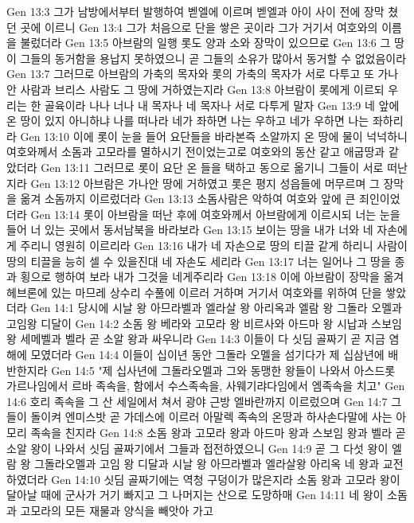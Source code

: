 Gen 13:3  그가 남방에서부터 발행하여 벧엘에 이르며 벧엘과 아이 사이 전에 장막 쳤던 곳에 이르니
Gen 13:4  그가 처음으로 단을 쌓은 곳이라 그가 거기서 여호와의 이름을 불렀더라
Gen 13:5  아브람의 일행 롯도 양과 소와 장막이 있으므로
Gen 13:6  그 땅이 그들의 동거함을 용납지 못하였으니 곧 그들의 소유가 많아서 동거할 수 없었음이라
Gen 13:7  그러므로 아브람의 가축의 목자와 롯의 가축의 목자가 서로 다투고 또 가나안 사람과 브리스 사람도 그 땅에 거하였는지라
Gen 13:8  아브람이 롯에게 이르되 우리는 한 골육이라 나나 너나 내 목자나 네 목자나 서로 다투게 말자
Gen 13:9  네 앞에 온 땅이 있지 아니하냐 나를 떠나라 네가 좌하면 나는 우하고 네가 우하면 나는 좌하리라
Gen 13:10  이에 롯이 눈을 들어 요단들을 바라본즉 소알까지 온 땅에 물이 넉넉하니 여호와께서 소돔과 고모라를 멸하시기 전이었는고로 여호와의 동산 같고 애굽땅과 같았더라
Gen 13:11  그러므로 롯이 요단 온 들을 택하고 동으로 옮기니 그들이 서로 떠난지라
Gen 13:12  아브람은 가나안 땅에 거하였고 롯은 평지 성읍들에 머무르며 그 장막을 옮겨 소돔까지 이르렀더라
Gen 13:13  소돔사람은 악하여 여호와 앞에 큰 죄인이었더라
Gen 13:14  롯이 아브람을 떠난 후에 여호와께서 아브람에게 이르시되 너는 눈을 들어 너 있는 곳에서 동서남북을 바라보라
Gen 13:15  보이는 땅을 내가 너와 네 자손에게 주리니 영원히 이르리라
Gen 13:16  내가 네 자손으로 땅의 티끌 같게 하리니 사람이 땅의 티끌을 능히 셀 수 있을진대 네 자손도 세리라
Gen 13:17  너는 일어나 그 땅을 종과 횡으로 행하여 보라 내가 그것을 네게주리라
Gen 13:18  이에 아브람이 장막을 옮겨 헤브론에 있는 마므레 상수리 수풀에 이르러 거하며 거기서 여호와를 위하여 단을 쌓았더라
Gen 14:1  당시에 시날 왕 아므라벨과 엘라살 왕 아리옥과 엘람 왕 그돌라 오멜과 고임왕 디달이
Gen 14:2  소돔 왕 베라와 고모라 왕 비르사와 아드마 왕 시납과 스보임 왕 세메벨과 벨라 곧 소알 왕과 싸우니라
Gen 14:3  이들이 다 싯딤 골짜기 곧 지금 염해에 모였더라
Gen 14:4  이들이 십이년 동안 그돌라 오멜을 섬기다가 제 십삼년에 배반한지라
Gen 14:5  "제 십사년에 그돌라오멜과 그와 동맹한 왕들이 나와서 아스드롯 가르나임에서 르바 족속을, 함에서 수스족속을, 사웨기랴다임에서 엠족속을 치고"
Gen 14:6  호리 족속을 그 산 세일에서 쳐서 광야 근방 엘바란까지 이르렀으며
Gen 14:7  그들이 돌이켜 엔미스밧 곧 가데스에 이르러 아말렉 족속의 온땅과 하사손다말에 사는 아모리 족속을 친지라
Gen 14:8  소돔 왕과 고모라 왕과 아드마 왕과 스보임 왕과 벨라 곧 소알 왕이 나와서 싯딤 골짜기에서 그들과 접전하였으니
Gen 14:9  곧 그 다섯 왕이 엘람 왕 그돌라오멜과 고임 왕 디달과 시날 왕 아므라벨과 엘라살왕 아리옥 네 왕과 교전하였더라
Gen 14:10  싯딤 골짜기에는 역청 구덩이가 많은지라 소돔 왕과 고모라 왕이 달아날 때에 군사가 거기 빠지고 그 나머지는 산으로 도망하매
Gen 14:11  네 왕이 소돔과 고모라의 모든 재물과 양식을 빼앗아 가고
